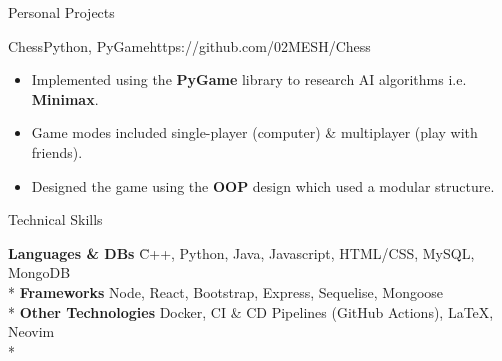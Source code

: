 \documentclass[11pt]{article}
\newlength{\secsep}
\newlength{\seperate}
\newcommand{\coloredhrulefill}[2][black]{%
    \leavevmode%
    \leaders\hbox{\textcolor{#1}{\rule{1ex}{0.5pt}}}\hfill\kern0pt%
}
\newcommand{\lineunder}{\vspace*{-24pt} \hspace*{-6pt} \coloredhrulefill[contactgrey]{}  \\* \vspace*{-15pt}}
\newenvironment{tabbedList}[1]{
	\begin{list}{}{
      \setlength{\itemsep}{0pt}
      \setlength{\labelsep}{0pt}
      \setlength{\labelwidth}{0pt}
      \setlength{\leftmargin}{10pt}
      \setlength{\rightmargin}{0pt}
      \setlength{\listparindent}{0pt}
      \setlength{\parsep}{0pt}
      \setlength{\parskip}{0pt}
      \setlength{\partopsep}{0pt}
      \setlength{\topsep}{#1}
	}
	\item[]
}{\end{list}}
\newenvironment{notabbedList}{
	\begin{tabbing}
}{\end{tabbing}\vspace{-1.2em}}
\newenvironment{resume_section}[1] {
	\textsc{\Large #1} \\*
	
	\lineunder
	\begin{tabbedList}{\secsep}
}{\end{tabbedList}\vspace{1.2\secsep}}
\newenvironment{personal_projects}[4] {
	\textbf{#1} \href{#4}{#3} $\mid$ {\scriptsize #2}  %
	\vspace*{4px}
	\begin{tabbedList}{0pt}
}{\end{tabbedList}\vspace*{1.5\secsep}}
\newenvironment{subitems}{
	\vspace*{-2px}
	\begin{itemize}[left=2pt]
		\setlength{\labelsep}{0.3em}
		\setlength{\itemsep}{0pt}
		\setlength{\parsep}{0pt}
		\setlength{\topsep}{0px}
}{\end{itemize}}
\begin{document}
\begin{resume_section}{Personal Projects}
		\vspace*{\seperate}	
	
		\begin{personal_projects} {Chess}{Python, PyGame}{\faGithub}{https://github.com/02MESH/Chess}
			\begin{subitems}
				\item{Implemented using the \textbf{PyGame} library to research AI algorithms i.e. \textbf{Minimax}.}
				\item{Game modes included single-player (computer) \& multiplayer (play with friends).}
				\item{Designed the game using the \textbf{OOP} design which used a modular structure.}
			\end{subitems}
		\end{personal_projects}
		
	\end{resume_section}
		\begin{resume_section}{Technical Skills}
		\begin{notabbedList}
			\textbf{Languages \& DBs} \hspace*{5pt} \= C++, Python, Java, Javascript, HTML/CSS, MySQL, MongoDB \\*
			\textbf{Frameworks} \> Node, React, Bootstrap,  Express, Sequelise, Mongoose\\*
			\textbf{Other Technologies} \> Docker, CI \& CD Pipelines (GitHub Actions), \LaTeX, Neovim\\*
		\end{notabbedList}
	\end{resume_section}
\end{document}
